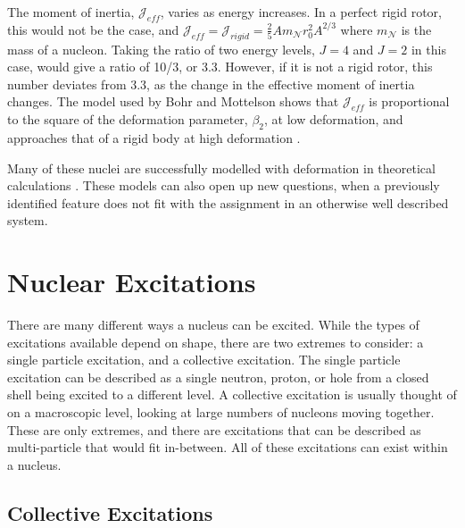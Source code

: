 The moment of inertia, $\mathscr{J}_{eff}$, varies as energy increases. In a perfect rigid rotor, this would not be the case, and $\mathscr{J}_{eff}=\mathscr{J}_{rigid}=\frac{2}{5}Am_{\mathscr{N}}r_0^2A^{2/3}$ where $m_{\mathscr{N}}$ is the mass of a nucleon. Taking the ratio of two energy levels, $J=4$ and $J=2$ in this case, would give a ratio of 10/3, or 3.3. However, if it is not a rigid rotor, this number deviates from 3.3, as the change in the effective moment of inertia changes. The model used by Bohr and Mottelson shows that $\mathscr{J}_{eff}$ is proportional to the square of the deformation parameter, $\beta_2$, at low deformation, and approaches that of a rigid body at high deformation \citep{bohr55:_deformation}.



Many of these nuclei are successfully modelled with deformation in theoretical calculations \citep{delaroche10:_systematics}. These models can also open up new questions, when a previously identified feature does not fit with the assignment in an otherwise well described system.

\section{Nuclear Excitations}
\label{sec:nuc_excite}

There are many different ways a nucleus can be excited. While the types of excitations available depend on shape, there are two extremes to consider: a single particle excitation, and a collective excitation. The single particle excitation can be described as a single neutron, proton, or hole from a closed shell being excited to a different level. A collective excitation is usually thought of on a macroscopic level, looking at large numbers of nucleons moving together. These are only extremes, and there are excitations that can be described as multi-particle that would fit in-between. All of these excitations can exist within a nucleus.

\subsection{Collective Excitations}
\label{sec:nuc_collective}

